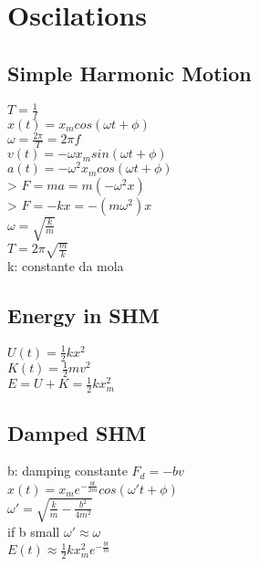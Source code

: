 \section{Oscilations}
\subsection{Simple Harmonic Motion}
$T=\frac{1}{f}$\\
$x\left(t\right)=x_mcos\left(\omega t+\phi \right)$\\
$\omega =\frac{2\pi }{T}=2\pi f$\\
$v\left(t\right)=-\omega x_msin\left(\omega t+\phi \right)$\\
$a\left(t\right)=-\omega ^2x_mcos\left(\omega t+\phi \right)$\\
> $F=ma=m\left(-\omega ^2x\right)$\\
> $F=-kx=-\left(m\omega ^2\right)x$\\
$\omega =\sqrt{\frac{k}{m}}$\\
$T=2\pi \sqrt{\frac{m}{k}}$\\
k: constante da mola
\subsection{Energy in SHM}
$U\left(t\right)=\frac{1}{2}kx^2$\\
$K\left(t\right)=\frac{1}{2}mv^2$\\
$E=U+K=\frac{1}{2}kx_m^2$\\
\subsection{Damped SHM}
b: damping constante
$F_d=-bv$\\
$x\left(t\right)=x_me^{-\frac{bt}{2m}}cos\left(\omega 't+\phi \right)$\\
$\omega '=\sqrt{\frac{k}{m}-\frac{b^2}{4m^2}}$\\
if b small  $\omega '\approx \omega$\\
$E\left(t\right)\approx \frac{1}{2}kx_m^2e^{-\frac{bt}{m}}$\\
